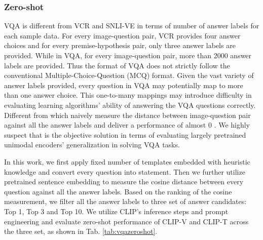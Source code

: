 \documentclass[runningheads]{llncs}
\begin{document}
\subsubsection{Zero-shot}
VQA is different from VCR and SNLI-VE in terms of number of answer labels for each sample data. For every image-question pair, VCR provides four answer choices and for every premise-hypothesis pair, only three answer labels are provided. While in VQA, for every image-question pair, more than 2000 answer labels are provided. Thus the format of VQA does not strictly follow the conventional Multiple-Choice-Question (MCQ) format. Given the vast variety of answer labels provided, every question in VQA may potentially map to more than one answer choice. This one-to-many mappings may introduce difficulty in evaluating learning algorithms' ability of answering the VQA questions correctly. Different from \cite{shengshen} which naively measure the distance between image-question pair against all the answer labels and deliver a performance of almost 0 . We highly suspect that is the objective solution in terms of evaluating largely pretrained unimodal encoders' generalization in solving VQA tasks.

In this work, we first apply fixed number of templates embedded with heuristic knowledge and convert every question into statement. Then we further utilize pretrained sentence embedding \cite{reimers2019sentence} to measure the cosine distance between every question against all the answer labels. Based on the ranking of the cosine measurement, we filter all the answer labels to three set of answer candidates: Top 1, Top 3 and Top 10. We utilize CLIP's inference steps and prompt engineering and evaluate zero-shot performance of CLIP-V and CLIP-T across the three set, as shown in Tab. \ref{tab:vqazeroshot}.

\begin{table}[h!]
\centering
{}
\caption{Zero-shot performance of CLIP-V and CLIP-T on VQA.}
\label{tab:vqazeroshot}
\end{table}
\end{document}
